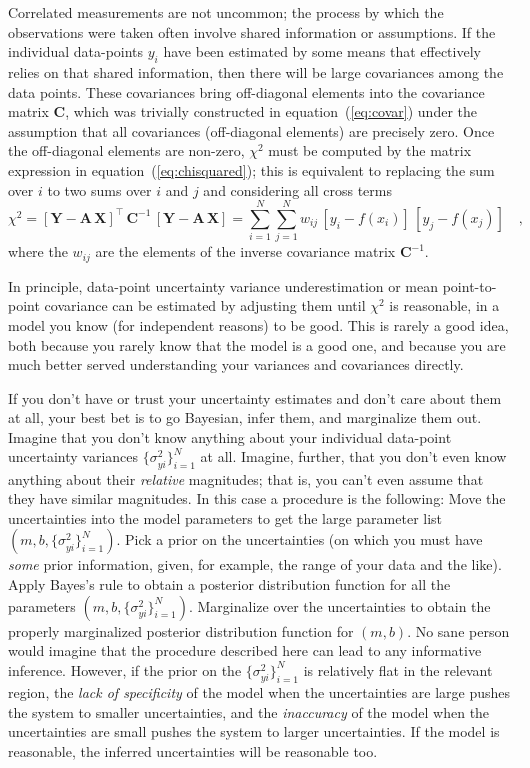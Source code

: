 \documentclass[12pt,twoside]{article}
\newcommand{\equationname}{equation}
\newcommand{\mmatrix}[1]{\boldsymbol{#1}}
\newcommand{\inverse}[1]{{#1}^{-1}}
\newcommand{\transpose}[1]{{#1}^{\scriptscriptstyle \top}}
\newcommand{\mA}{\mmatrix{A}}
\newcommand{\mC}{\mmatrix{C}}
\newcommand{\mCinv}{\inverse{\mC}}
\newcommand{\mX}{\mmatrix{X}}
\newcommand{\mY}{\mmatrix{Y}}
\newcommand{\setofall}[3]{\{{#1}\}_{{#2}}^{{#3}}}
\newcommand{\allsigmay}{\setofall{\sigma_{yi}^2}{i=1}{N}}
\begin{document}
Correlated measurements are not uncommon; the process by which the
observations were taken often involve shared information or
assumptions. If the individual data-points $y_i$ have been estimated
by some means that effectively relies on that shared information, then
there will be large covariances among the data points.  These
covariances bring off-diagonal elements into the covariance matrix
$\mC$, which was trivially constructed in
\equationname~(\ref{eq:covar}) under the assumption that all
covariances (off-diagonal elements) are precisely zero.  Once the
off-diagonal elements are non-zero, $\chi^2$ must be computed by the
matrix expression in \equationname~(\ref{eq:chisquared}); this is
equivalent to replacing the sum over $i$ to two sums over $i$ and $j$
and considering all cross terms
\begin{equation}
\chi^2 =
 \transpose{\left[\mY-\mA\,\mX\right]}\,\mCinv\,\left[\mY-\mA\,\mX\right]
 = \sum_{i=1}^N \sum_{j=1}^N
 w_{ij}\,\left[y_i-f(x_i)\right]\,\left[y_j-f(x_j)\right]
 \quad,
\end{equation} 
where the $w_{ij}$ are the elements of the inverse covariance
matrix $\inverse{\mC}$.

In principle, data-point uncertainty variance underestimation or mean
point-to-point covariance can be estimated by adjusting them until
$\chi^2$ is reasonable, in a model you know (for independent reasons)
to be good.  This is rarely a good idea, both because you rarely know
that the model is a good one, and because you are much better served
understanding your variances and covariances directly.

If you don't have or trust your uncertainty estimates and don't care
about them at all, your best bet is to go Bayesian, infer them, and
marginalize them out.  Imagine that you don't know anything about your
individual data-point uncertainty variances $\allsigmay$ at all.
Imagine, further, that you don't even know anything about their
\emph{relative} magnitudes; that is, you can't even assume that they
have similar magnitudes.  In this case a procedure is the following:
Move the uncertainties into the model parameters to get the large
parameter list $(m,b,\allsigmay)$.  Pick a prior on the uncertainties
(on which you must have \emph{some} prior information, given, for
example, the range of your data and the like).  Apply Bayes's rule to
obtain a posterior distribution function for all the parameters
$(m,b,\allsigmay)$.  Marginalize over the uncertainties to obtain the
properly marginalized posterior distribution function for $(m,b)$.  No
sane person would imagine that the procedure described here can lead
to any informative inference.  However, if the prior on the
$\allsigmay$ is relatively flat in the relevant region, the \emph{lack
  of specificity} of the model when the uncertainties are large pushes
the system to smaller uncertainties, and the \emph{inaccuracy} of the
model when the uncertainties are small pushes the system to larger
uncertainties.  If the model is reasonable, the inferred uncertainties
will be reasonable too.
\end{document}
